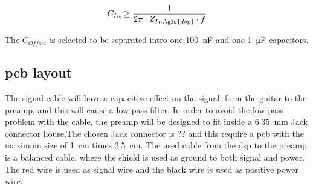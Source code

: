 \begin{equation}\label{eq:preamp_cout}
        C_{In} \geq  \frac{1}{2 \pi \cdot Z_{In,\gls{dsp}} \cdot f}
        \addunit{\si{\farad}}
    \end{equation}

    \startexplain
    \stopexplain
    
 The $C_{Offset}$ is selected to be separated intro one \SI{100}{\nano\farad} and one \SI{1}{\micro\farad} capacitors.
 
\subsection{\gls{pcb} layout} 
The signal cable will have a capacitive effect on the signal, form the guitar to the \gls{preamp}, and this will cause a low pass filter. In order to avoid the low pass problem with the cable, the \gls{preamp} will be designed to fit inside a \SI{6.35}{\milli\meter} Jack connector house.The chosen Jack connector is ?? and this require a \gls{pcb} with the maximum size of  \SI{1}{\centi\meter} times \SI{2.5}{\centi\meter}. The used cable from the \gls{dsp} to the \gls{preamp} is a balanced cable, where the shield is used as ground to both signal and power. The red wire is used as signal wire and the black wire is used as positive power wire.
 
 
 